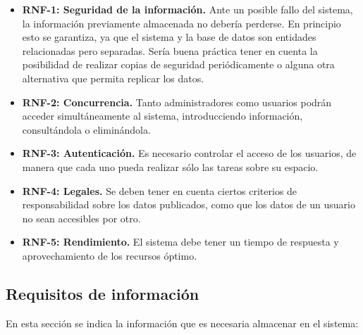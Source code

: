 \begin{itemize}
	\item \textbf{RNF-1: Seguridad de la información.} Ante un posible fallo del sistema, la información previamente almacenada no debería perderse. En principio esto se garantiza, ya que el sistema y la base de datos son entidades relacionadas pero separadas. Sería buena práctica tener en cuenta la posibilidad de realizar copias de seguridad periódicamente o alguna otra alternativa que permita replicar los datos.
	\item \textbf{RNF-2: Concurrencia.} Tanto administradores como usuarios podrán acceder simultáneamente al sistema, introducciendo información, consultándola o eliminándola.
	\item \textbf{RNF-3: Autenticación.} Es necesario controlar el acceso de los usuarios, de manera que cada uno pueda realizar sólo las tareas sobre su espacio.
	\item \textbf{RNF-4: Legales.} Se deben tener en cuenta ciertos criterios de responsabilidad sobre los datos publicados, como que los datos de un usuario no sean accesibles por otro.
	\item \textbf{RNF-5: Rendimiento.} El sistema debe tener un tiempo de respuesta	y aprovechamiento de los recursos óptimo.
\end{itemize}

\subsection{Requisitos de información}
En esta sección se indica la información que es necesaria almacenar en el sistema:

